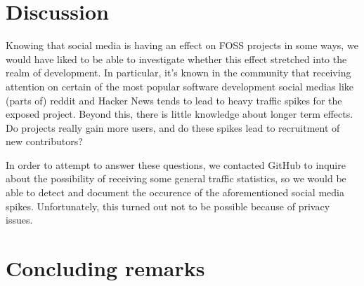 \documentclass[a4paper,11pt]{article} %
\begin{document}
\section{Discussion}

Knowing that social media is having an effect on FOSS projects in some
ways, we would have liked to be able to investigate whether this
effect stretched into the realm of development. In particular, it's
known in the community that receiving attention on certain of the most
popular software development social medias like (parts of) reddit and
Hacker News tends to lead to heavy traffic spikes for the exposed
project. Beyond this, there is little knowledge about longer term
effects. Do projects really gain more users, and do these spikes lead
to recruitment of new contributors?

In order to attempt to answer these questions, we contacted GitHub to
inquire about the possibility of receiving some general traffic
statistics, so we would be able to detect and document the occurence
of the aforementioned social media spikes. Unfortunately, this turned
out not to be possible because of privacy issues.

\section{Concluding remarks}

\printbibliography
 
\end{document}
